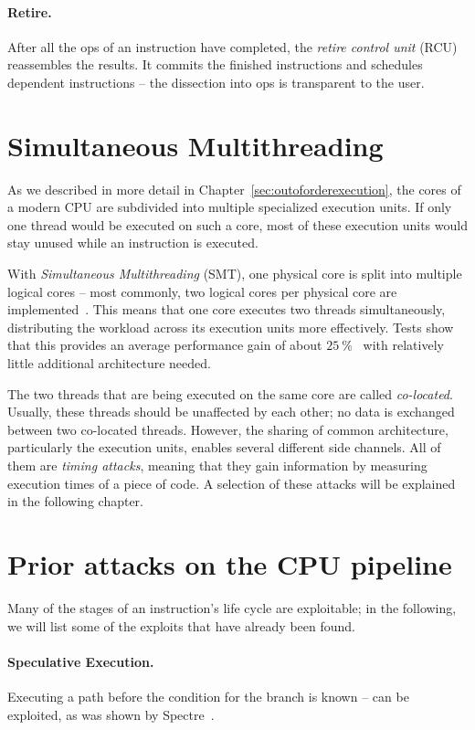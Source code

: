 \documentclass[11pt,
  titlepage=false,
  parskip=half,      %
]{scrreprt}
\begin{document}
\paragraph{Retire.}
After all the \textmu ops of an instruction have completed, the \textit{retire control unit} (RCU) reassembles the results.
It commits the finished instructions and schedules dependent instructions -- the dissection into \textmu ops is transparent to the user.

\section{Simultaneous Multithreading}
\label{sec:smt}

As we described in more detail in Chapter~\ref{sec:outoforderexecution},
the cores of a modern CPU are subdivided into multiple specialized execution units.
If only one thread would be executed on such a core,
most of these execution units would stay unused while an instruction is executed.

With \textit{Simultaneous Multithreading} (SMT), one physical core is split into multiple logical cores
-- most commonly, two logical cores per physical core are implemented~\cite{tullsen1995simultaneous}.
This means that one core executes two threads simultaneously, distributing the workload across its execution units more effectively.
Tests show that this provides an average performance gain of about $25~\%$~\cite{Phoronix2018HT, Cutress2020SMT}
with relatively little additional architecture needed.

The two threads that are being executed on the same core are called \textit{co-located}.
Usually, these threads should be unaffected by each other; no data is exchanged between two co-located threads.
However, the sharing of common architecture, particularly the execution units, enables several different side channels.
All of them are \textit{timing attacks}, meaning that they gain information by measuring execution times of a piece of code.
A selection of these attacks will be explained in the following chapter.

\section{Prior attacks on the CPU pipeline }
\label{sec:exploits}
Many of the stages of an instruction's life cycle are exploitable;
in the following, we will list some of the exploits that have already been found.

\paragraph{Speculative Execution.}
Executing a path before the condition for the branch is known --
can be exploited, as was shown by Spectre~\cite{spKocherHFGGHHLM019}.
\end{document}
